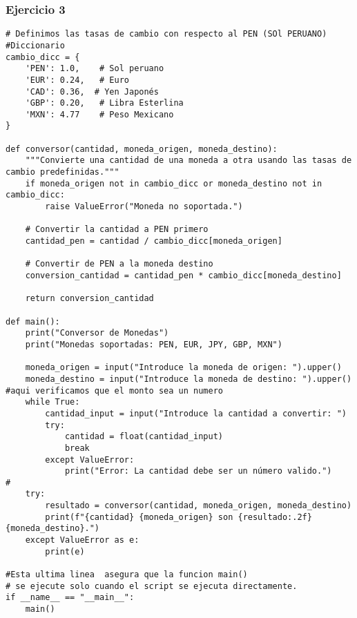 \documentclass[10pt,a4paper]{article}
\begin{document}
\subsubsection{Ejercicio 3}
\begin{lstlisting}
# Definimos las tasas de cambio con respecto al PEN (SOl PERUANO)
#Diccionario
cambio_dicc = {
    'PEN': 1.0,    # Sol peruano
    'EUR': 0.24,   # Euro
    'CAD': 0.36,  # Yen Japonés
    'GBP': 0.20,   # Libra Esterlina
    'MXN': 4.77    # Peso Mexicano
}

def conversor(cantidad, moneda_origen, moneda_destino):
    """Convierte una cantidad de una moneda a otra usando las tasas de cambio predefinidas."""
    if moneda_origen not in cambio_dicc or moneda_destino not in cambio_dicc:
        raise ValueError("Moneda no soportada.")
    
    # Convertir la cantidad a PEN primero
    cantidad_pen = cantidad / cambio_dicc[moneda_origen]
    
    # Convertir de PEN a la moneda destino
    conversion_cantidad = cantidad_pen * cambio_dicc[moneda_destino]
    
    return conversion_cantidad

def main():
    print("Conversor de Monedas")
    print("Monedas soportadas: PEN, EUR, JPY, GBP, MXN")
    
    moneda_origen = input("Introduce la moneda de origen: ").upper()
    moneda_destino = input("Introduce la moneda de destino: ").upper()
#aqui verificamos que el monto sea un numero    
    while True:
        cantidad_input = input("Introduce la cantidad a convertir: ")
        try:
            cantidad = float(cantidad_input)
            break
        except ValueError:
            print("Error: La cantidad debe ser un número valido.")
#
    try:
        resultado = conversor(cantidad, moneda_origen, moneda_destino)
        print(f"{cantidad} {moneda_origen} son {resultado:.2f} {moneda_destino}.")
    except ValueError as e:
        print(e)

#Esta ultima linea  asegura que la funcion main() 
# se ejecute solo cuando el script se ejecuta directamente.
if __name__ == "__main__":
    main()

\end{lstlisting}
\end{document}
